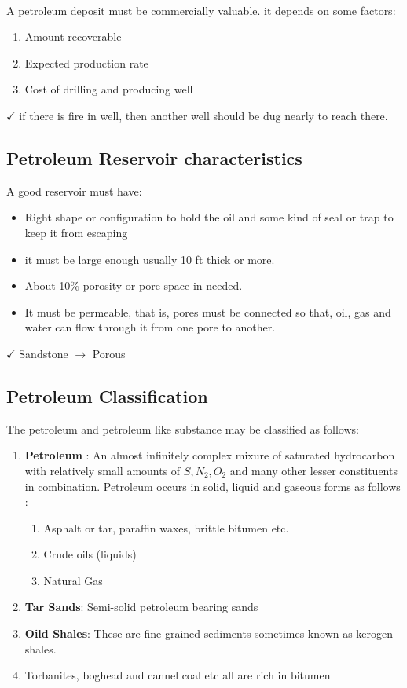 \documentclass{article}
\begin{document}
\paragraph*{} A petroleum deposit must be commercially valuable. it depends on some factors: 
\begin{enumerate}
  \item Amount recoverable 
  \item Expected production rate 
  \item Cost of drilling and producing well
\end{enumerate}

$\checkmark$ if there is fire in well, then another well should be dug nearly to reach there. 

\subsection*{Petroleum Reservoir characteristics}
A good reservoir must have: 
\begin{itemize}
  \item Right shape or configuration to hold the oil and some kind of seal or trap to keep it from escaping
  \item it must be large enough usually 10 ft thick or more. 
  \item About 10\% porosity or pore space in needed.
  \item It must be permeable, that is, pores must be connected so that, oil, gas and water can flow through it from one pore to another. 
\end{itemize}

$\checkmark$ Sandstone $\rightarrow$ Porous

\subsection*{Petroleum Classification}
The petroleum and petroleum like substance may be classified as follows: 
\begin{enumerate}
  \item \textbf{Petroleum} : An almost infinitely complex mixure of saturated hydrocarbon with relatively small amounts of $S,N_2, O_2$ and many other lesser constituents in combination. Petroleum occurs in solid, liquid and gaseous forms as follows : 
  \begin{enumerate}
    \item Asphalt or tar, paraffin waxes, brittle bitumen etc.
    \item Crude oils (liquids)
    \item Natural Gas 
  \end{enumerate} 
  \item \textbf{Tar Sands}: Semi-solid petroleum bearing sands 
  \item \textbf{Oild Shales}: These are fine grained sediments sometimes known as kerogen shales. 
  \item Torbanites, boghead and cannel coal etc all are rich in bitumen 
\end{enumerate}
\end{document}
